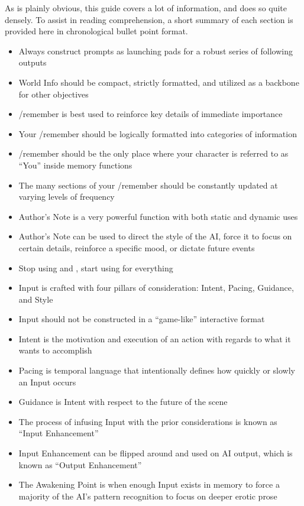 \documentclass[Source-main.tex]{subfiles}
\begin{document}
{}

As is plainly obvious, this guide covers a lot of information, and does so quite densely.
To assist in reading comprehension, a short summary of each section is provided here in chronological bullet point format.

\begin{itemize}

\item{Always construct prompts as launching pads for a robust series of following outputs}

\item{World Info should be compact, strictly formatted, and utilized as a backbone for other objectives}

\item{/remember is best used to reinforce key details of immediate importance}
\item{Your /remember should be logically formatted into categories of information}
\item{/remember should be the only place where your character is referred to as “You” inside memory functions}
\item{The many sections of your /remember should be constantly updated at varying levels of frequency}

\item{Author's Note is a very powerful function with both static and dynamic uses} 
\item{Author's Note can be used to direct the style of the AI, force it to focus on certain details, reinforce a specific mood, or dictate future events}

\item{Stop using  and , start using  for everything}
\item{Input is crafted with four pillars of consideration: Intent, Pacing, Guidance, and Style}
\item{Input should not be constructed in a “game-like” interactive format}
\item{Intent is the motivation and execution of an action with regards to what it wants to accomplish}
\item{Pacing is temporal language that intentionally defines how quickly or slowly an Input occurs}
\item{Guidance is Intent with respect to the future of the scene}
\item{The process of infusing Input with the prior considerations is known as “Input Enhancement”}
\item{Input Enhancement can be flipped around and used on AI output, which is known as “Output Enhancement”}
\item{The Awakening Point is when enough Input exists in memory to force a majority of the AI's pattern recognition to focus on deeper erotic prose}


\end{itemize}
\end{document}
